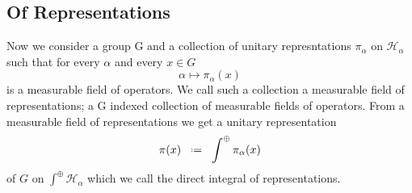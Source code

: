 \documentclass[12pt, openany]{book}
\numberwithin{equation}{section}
\theoremstyle{definition}
\theoremstyle{remark}
\numberwithin{equation}{section}
\begin{document}
    \subsection{Of Representations}
    Now we consider a group G and a collection of unitary represntations \(\pi_\alpha\) on \(\mathcal{H}_\alpha\) such that for every \(\alpha\)  and every \(x\in G\)
    \[\alpha \mapsto \pi_\alpha(x)\]
    is a measurable field of operators. We call such a collection a measurable field of representations; a G indexed collection of measurable fields of operators. From a measurable field of representations we get a unitary representation 
    \[\pi(x) \defeq \int^\oplus \pi_\alpha(x)\]
    of \(G\) on \(\int^\oplus \mathcal{H}_\alpha\) which we call the direct integral of representations. 




\listoftodos
{}


\newpage


\end{document}
